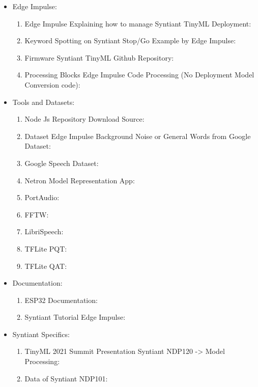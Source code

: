 \begin{itemize} 
\item Edge Impulse:
\begin{enumerate}
    \item Edge Impulse Explaining how to manage Syntiant TinyML Deployment: \cite{edgeimpulse_syntiant_tinyml}
    \item Keyword Spotting on Syntiant Stop/Go Example by Edge Impulse: \cite{edgeimpulse_kws_example}
    \item Firmware Syntiant TinyML Github Repository: \cite{edgeimpulse_firmware_syntiant}
    \item Processing Blocks Edge Impulse Code Processing (No Deployment Model Conversion code): \cite{edgeimpulse_processing_blocks}
\end{enumerate}
\item Tools and Datasets:
\begin{enumerate}
    \item Node Js Repository Download Source: \cite{nodejs_repository}
    \item Dataset Edge Impulse Background Noise or General Words from Google Dataset: \cite{edgeimpulse_dataset_499022}
    \item Google Speech Dataset: \cite{speechcommands}
    \item Netron Model Representation App: \cite{netron}
    \item PortAudio: \cite{portaudio}
    \item FFTW: \cite{FFTW}
    \item LibriSpeech: \cite{librispeech}
    \item TFLite PQT:\cite{pqt_tensorflow}
    \item TFLite QAT:\cite{qat_tensorflow}
\end{enumerate}
\item Documentation:
\begin{enumerate}
    \item ESP32 Documentation: \cite{esp32documentation}
    \item Syntiant Tutorial Edge Impulse: \cite{syntiant_tutorial_edgeimpulse}
\end{enumerate}
\item Syntiant Specifics:
\begin{enumerate}
    \item TinyML 2021 Summit Presentation Syntiant NDP120 -> Model Processing: \cite{tinyML_2021_summit}
    \item Data of Syntiant NDP101: \cite{experimental_try_on_ndp101}

\end{enumerate}
\end{itemize}
